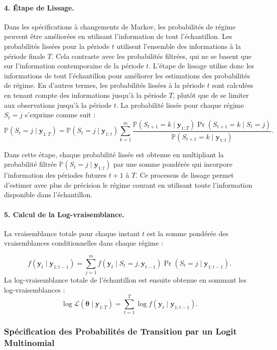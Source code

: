 \begin{sloppypar}
\paragraph{4. Étape de Lissage.} Dans les spécifications à changements de Markov, les probabilités de régime peuvent être améliorées en utilisant l'information de tout l'échantillon. Les probabilités lissées pour la période $t$ utilisent l'ensemble des informations à la période finale $T$. Cela contraste avec les probabilités filtrées, qui ne se basent que sur l'information contemporaine de la période $t$. L'étape de lissage utilise donc les informations de tout l’échantillon pour améliorer les estimations des probabilités de régime. En d'autres termes, les probabilités lissées à la période \( t \) sont calculées en tenant compte des informations jusqu'à la période \( T \), plutôt que de se limiter aux observations jusqu'à la période \( t \). La probabilité lissée pour chaque régime \( S_t = j \) s'exprime comme suit :
\[
\mathbb{P}(S_t = j \mid \bm{y}_{1:T}) = \mathbb{P}(S_t = j \mid \bm{y}_{1:t}) \sum_{k=1}^m \frac{\mathbb{P}(S_{t+1} = k \mid \bm{y}_{1:T}) \Pr(S_{t+1} = k \mid S_t = j)}{\mathbb{P}(S_{t+1} = k \mid \bm{y}_{1:t})}.
\]

Dans cette étape, chaque probabilité lissée est obtenue en multipliant la probabilité filtrée \( \mathbb{P}(S_t = j \mid \bm{y}_{1:t}) \) par une somme pondérée qui incorpore l'information des périodes futures \( t+1 \) à \( T \). Ce processus de lissage permet d'estimer avec plus de précision le régime courant en utilisant toute l'information disponible dans l'échantillon.


\paragraph{5. Calcul de la Log-vraisemblance.} La vraisemblance totale pour chaque instant \( t \) est la somme pondérée des vraisemblances conditionnelles dans chaque régime :

\[
f(\bm{y}_t \mid \bm{y}_{1:t-1}) = \sum_{j=1}^m f(\bm{y}_t \mid S_t = j, \bm{y}_{t-1}) \Pr(S_t = j \mid \bm{y}_{1:t-1}).
\]
La log-vraisemblance totale de l’échantillon est ensuite obtenue en sommant les log-vraisemblances :
\[
\log \mathcal{L}(\bm{\theta} \mid \bm{y}_{1:T}) = \sum_{t=1}^T \log f(\bm{y}_t \mid \bm{y}_{1:t-1}).
\]

\subsubsection{Spécification des Probabilités de Transition par un Logit Multinomial}


\end{sloppypar}

